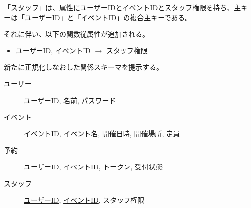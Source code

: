 \documentclass[dvipdfmx]{jarticle}
\begin{document}
「スタッフ」は、属性にユーザーIDとイベントIDとスタッフ権限を持ち、主キーは「ユーザーID」と「イベントID」の複合主キーである。

それに伴い、以下の関数従属性が追加される。
\begin{itemize}
  \item {ユーザーID, イベントID} $\rightarrow$ {スタッフ権限}
\end{itemize}

新たに正規化しなおした関係スキーマを提示する。
\begin{description}
  \item[ユーザー] \underline{ユーザーID}, 名前, パスワード
  \item[イベント] \underline{イベントID}, イベント名, 開催日時, 開催場所, 定員
  \item[予約] ユーザーID, イベントID, \underline{トークン}, 受付状態
  \item[スタッフ] \underline{ユーザーID}, \underline{イベントID}, スタッフ権限
\end{description}
\end{document}

